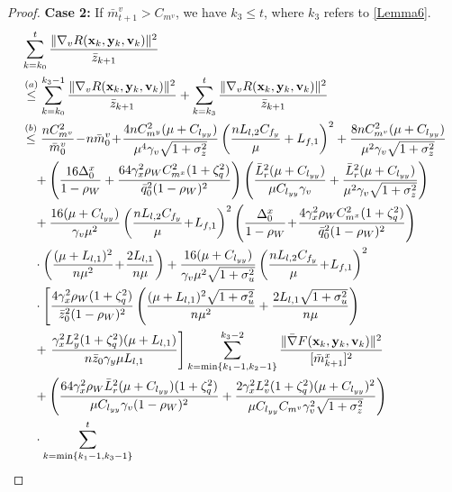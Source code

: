 \documentclass{article}
\theoremstyle{plain}
\theoremstyle{definition}
\theoremstyle{remark}
\begin{document}
\begin{proof}
\textbf{Case 2:} If $\bar{m}^v_{t+1} > C_{m^v}$, we have $k_3 \leq t$, where $k_3$ refers to \cref{Lemma6}.
\begin{align}
&\sum_{k=k_0}^t \frac{\|\nabla_v  R(\mathbf{x}_k, \mathbf{y}_k, \mathbf{v}_k)\|^2}{\bar{z}_{k+1}} \nonumber\\
&\overset{(a)}{\leq} \sum_{k=k_0}^{k_3-1} \frac{\|\nabla_v  R(\mathbf{x}_k, \mathbf{y}_k, \mathbf{v}_k)\|^2}{\bar{z}_{k+1}}+ \sum_{k=k_3}^t \frac{\|\nabla_v  R(\mathbf{x}_k, \mathbf{y}_k, \mathbf{v}_k)\|^2}{\bar{z}_{k+1}} \notag \\
&\overset{(b)}{\leq}\frac{nC_{m^v}^2}{\bar{m}^v_{0}}\! -\! n\bar{m}^v_{0} \!+\! \frac{4nC_{m^y}^2(\mu + C_{l_{yy}})}{\mu^4\gamma_v\sqrt{1+\sigma_z^2}}\left(\frac{nL_{l,2}C_{f_y}}{\mu}+L_{f,1}\right)^2 + \frac{8nC_{m^v}^2(\mu + C_{l_{yy}})}{\mu^2\gamma_v\sqrt{1+\sigma_z^2}}\notag \\
&\quad +\left(\frac{16\Delta_0^x}{1-\rho_W}+\frac{64\gamma_x^2\rho_WC_{m^x}^2(1+\zeta_q^2)}{\bar{q}_0^2(1-\rho_W)^2}\right)\left(\frac{ \bar{L}_r^2(\mu + C_{l_{yy}})}{\mu C_{l_{yy}}\gamma_v}+\frac{\bar{L}_r^2(\mu+C_{l_{yy}})}{\mu^2\gamma_v\sqrt{1+\sigma_z^2}}\right)\nonumber\\
&\quad + \frac{16(\mu + C_{l_{yy}})}{\gamma_v\mu^2}\left(\frac{nL_{l,2}C_{f_y}}{\mu}\!+\!L_{f,1}\right)^2 \left(\frac{\Delta_0^x}{1-\rho_W}\!+\!\frac{4 \gamma_x^2 \rho_WC_{m^x}^2 (1 + \zeta_q^2)}{\bar{q}_0^2(1 - \rho_W)^2} \right)\notag\\
&\quad\cdot\left(\frac{(\mu+L_{l,1})^2}{n\mu^2 }\!+\!\frac{2L_{l,1}}{n\mu }\right)+\frac{16(\mu + C_{l_{yy}})}{\gamma_v\mu^2\sqrt{1+\sigma_u^2}}\left(\frac{nL_{l,2}C_{f_y}}{\mu}\!+\!L_{f,1}\right)^2\notag \\
&\quad\cdot\left[\frac{4 \gamma_x^2 \rho_W (1 + \zeta_q^2)}{\bar{z}_0^2(1 - \rho_W)^2} \left(\frac{(\mu+L_{l,1})^2\sqrt{1+\sigma_u^2}}{n\mu^2 }+\frac{2L_{l,1}\sqrt{1+\sigma_u^2}}{n\mu }\right)\right.\nonumber\\
&\quad +\left.\frac{\gamma_x^2L_y^2(1+\zeta_q^2)(\mu + L_{l,1})}{n\bar{z}_0\gamma_y \mu L_{l,1}}\right]\sum_{k=\min\{k_1-1,k_2-1\}}^{k_3-2} 
 \frac{\| \bar{\nabla} F(\mathbf{x}_{k},\mathbf{y}_{k},\mathbf{v}_{k})\|^2}{[\bar{m}^x_{k+1}]^2}\nonumber\\
&\quad+ \left(\frac{64 \gamma_x^2 \rho_W \bar{L}_r^2(\mu + C_{l_{yy}})(1 + \zeta_q^2)}{\mu C_{l_{yy}}\gamma_v(1 - \rho_W)^2} + \frac{2\gamma_x^2L_v^2(1+\zeta_q^2)(\mu + C_{l_{yy}})^2}{\mu C_{l_{yy}}C_{m^v}\gamma_v^2\sqrt{1+\sigma_z^2}}\right)\notag\\
&\quad\cdot\sum_{k=\min\{k_1-1,k_3-1\}}^{t} 

\end{align}
\end{proof}
\end{document}
